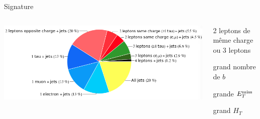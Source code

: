 \begin{frame}
\begin{varblock}[11cm]{Signature}
\begin{columns}
\begin{column}{0.5\textwidth}
\hspace*{0.8cm}
\includegraphics[width=1.2\textwidth]{Figures/FourTops/pie_chart_testinkscape.png}
\end{column}
\hspace*{1.5cm}
\begin{column}{0.5\textwidth}
\begin{maliste}
\item 2 leptons de même charge \\
ou 3 leptons
\item grand nombre de $b$
\item grande $E_T^{\text{miss}}$ 
\item grand $H_T$ 
\end{maliste}
\end{column}
\end{columns}
\end{varblock}
\end{frame}

